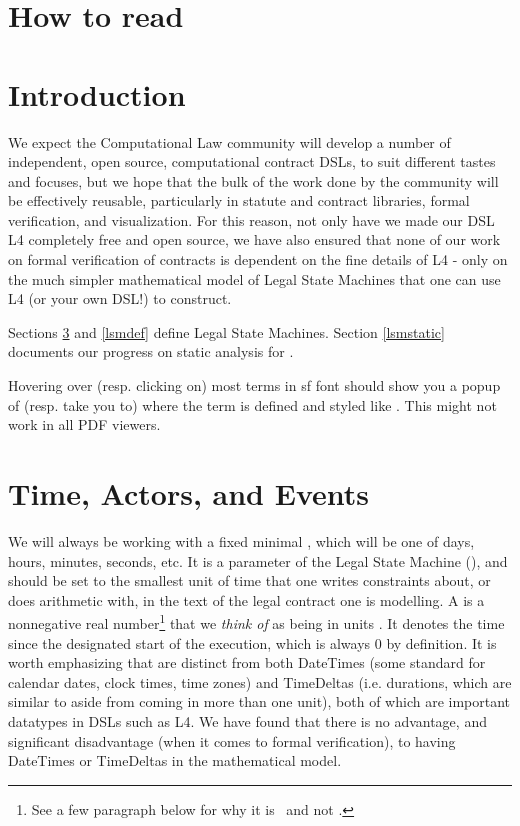 \documentclass[12pt]{article}
\newcommand{\term}[1]{\EM{\textsf{\hyperref[#1]{#1}}}\xspace}
\newcommand{\termz}[2]{\EM{\textsf{\hyperref[#1]{#2}}}\xspace}
\newcommand{\lsmslong}{Legal State Machines\xspace}
\newcommand{\lsm}{\texorpdfstring{\termz{lsm}{LSM}}{LSM}}
\newcommand{\lsms}{\texorpdfstring{\termz{lsm}{LSMs}}{LSMs}}
\newcommand{\timeunit}{\term{timeunit}}
\newcommand{\timestamps}{\termz{timestamp}{timestamps}}
\newcommand{\TS}{\EM{\mathbb{\hyperref[TS]{T}}}\xsapce}
\begin{document}
\tableofcontents

\section{How to read}

\section{Introduction}

We expect the Computational Law community will develop a number of independent, open source, computational contract DSLs, to suit different tastes and focuses, but we hope that the bulk of the work done by the community will be effectively reusable, particularly in statute and contract libraries, formal verification, and visualization. For this reason, not only have we made our DSL L4 completely free and open source, we have also ensured that none of our work on formal verification of contracts is dependent on the fine details of L4 - only on the much simpler mathematical model of \lsmslong that one can use L4 (or your own DSL!) to construct.

Sections \ref{basics} and \ref{lsmdef} define \lsmslong. Section \ref{lsmstatic} documents our progress on static analysis for \lsms.

Hovering over (resp. clicking on) most terms in \textsf{{sf font}} should show you a popup of (resp. take you to)  where the term is defined and styled like . This might not work in all PDF viewers.


\section{Time, Actors, and Events} \label{basics}
We will always be working with a fixed minimal , which will be one of days, hours, minutes, seconds, etc. It is a parameter of the Legal State Machine (\lsm), and should be set to the smallest unit of time that one writes constraints about, or does arithmetic with, in the text of the legal contract one is modelling.  A  is  a nonnegative real number\footnote{See a few paragraph below for why it is \RR\, and not \NN.} that we \textit{think of} as being in units \timeunit. It denotes the time since the designated start of the \lsm execution, which is always 0 by definition.
It is worth emphasizing that \timestamps are distinct from both DateTimes (some standard for calendar dates, clock times, time zones) and TimeDeltas (i.e. durations, which are similar to \timeunit aside from coming in more than one unit), both of which are important datatypes in DSLs such as L4. We have found that there is no advantage, and significant disadvantage (when it comes to formal verification), to having DateTimes or TimeDeltas in the mathematical model.
\end{document}
